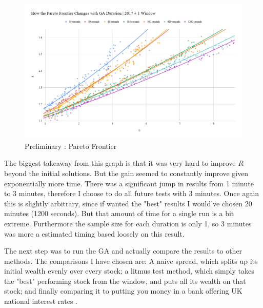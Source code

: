 \documentclass[11pt]{article}
\begin{document}
    \begin{figure}[H] %
        \includegraphics[width=\textwidth]{HowTheParetoFrontierChangesWithGADuration_2017-1Window}
        \caption{Preliminary : Pareto Frontier}
            \label{fig:HowTheParetoFrontierChangesWithGADuration_2017-1Window}
    \end{figure}

    The biggest takeaway from this graph is that it was very hard to improve \(R\) beyond
    the initial solutions. But the gain seemed to constantly improve given exponentially
    more time. There was a significant jump in results from 1 minute to 3 minutes,
    therefore I choose to do all future tests with 3 minutes. Once again this is slightly
    arbitrary, since if wanted the "best" results I would've chosen 20 minutes (1200 seconds).
    But that amount of time for a single run is a bit extreme. Furthermore the sample size for
    each duration is only 1, so 3 minutes was more a estimated timing based loosely
    on this result.

    The next step was to run the GA and actually compare the results to other methods.
    The comparisons I have chosen are: A naive spread, which splits up its initial wealth
    evenly over every stock; a litmus test method, which simply takes the "best" performing
    stock from the window, and puts all its wealth on that stock; and finally
    comparing it to putting you money in a bank offering UK national interest rates
    \cite{BankOfE}.
\end{document}
